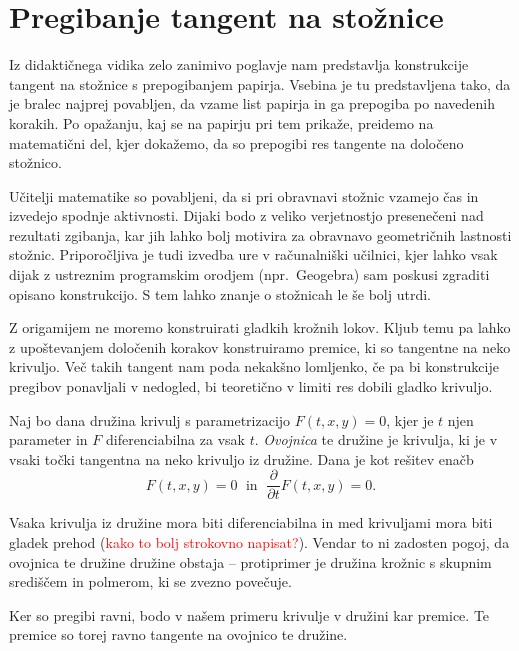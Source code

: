 \section{Pregibanje tangent na stožnice}
\label{pogl:stoznice}

Iz didaktičnega vidika zelo zanimivo poglavje nam predstavlja konstrukcije tangent na stožnice s prepogibanjem papirja. Vsebina je tu predstavljena tako, da je bralec najprej povabljen, da vzame list papirja in ga prepogiba po navedenih korakih. Po opažanju, kaj se na papirju pri tem prikaže, preidemo na matematični del, kjer dokažemo, da so prepogibi res tangente na določeno stožnico.

Učitelji matematike so povabljeni, da si pri obravnavi stožnic vzamejo čas in izvedejo spodnje aktivnosti. Dijaki bodo z veliko verjetnostjo presenečeni nad rezultati zgibanja, kar jih lahko bolj motivira za obravnavo geometričnih lastnosti stožnic. Priporočljiva je tudi izvedba ure v računalniški učilnici, kjer lahko vsak dijak z ustreznim programskim orodjem (npr.\ Geogebra) sam poskusi zgraditi opisano konstrukcijo. S tem lahko znanje o stožnicah le še bolj utrdi.

Z origamijem ne moremo konstruirati gladkih krožnih lokov. Kljub temu pa lahko z upoštevanjem določenih korakov konstruiramo premice, ki so tangentne na neko krivuljo. Več takih tangent nam poda nekakšno lomljenko, če pa bi konstrukcije pregibov ponavljali v nedogled, bi teoretično v limiti res dobili gladko krivuljo.

\begin{definicija}
    \label{def:ovojnica}
    Naj bo dana družina krivulj s parametrizacijo $F(t, x, y) = 0$, kjer je $t$ njen parameter in $F$ diferenciabilna za vsak $t$. \emph{Ovojnica} te družine je krivulja, ki je v vsaki točki tangentna na neko krivuljo iz družine. Dana je kot rešitev enačb
    $$ F(t, x, y) = 0 \; \text{ in } \; \frac{\partial}{\partial t} F(t, x, y) = 0. $$
\end{definicija}

\begin{opomba}
    Vsaka krivulja iz družine mora biti diferenciabilna in med krivuljami mora biti gladek prehod (\textcolor{red}{kako to bolj strokovno napisat?}). Vendar to ni zadosten pogoj, da ovojnica te družine družine obstaja -- protiprimer je družina krožnic s skupnim središčem in polmerom, ki se zvezno povečuje.
\end{opomba}

\begin{opomba}
    Ker so pregibi ravni, bodo v našem primeru krivulje v družini kar premice. Te premice so torej ravno tangente na ovojnico te družine.
\end{opomba}


